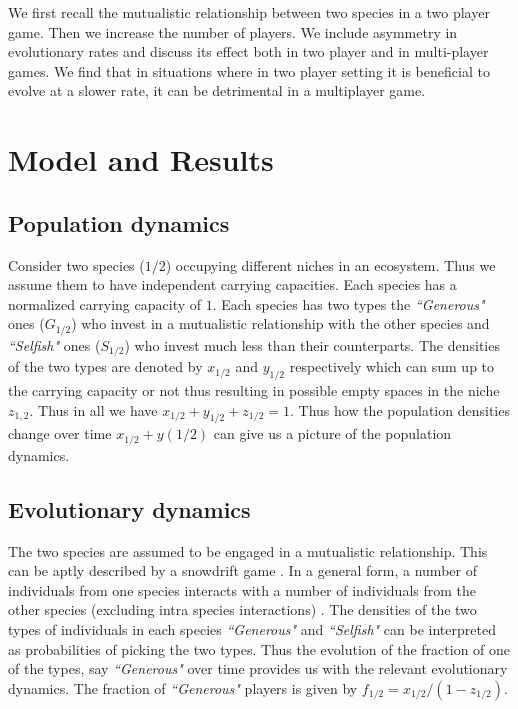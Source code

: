 \documentclass{pnastwo}
\begin{document}
\begin{article}
We first
recall the mutualistic relationship between two species in a two player game.
Then we increase the number of players.
We include asymmetry in evolutionary rates and discuss its effect both in two player and in multi-player games.
We find that in situations where in two player setting it is beneficial to evolve at a slower rate, it can be detrimental in a multiplayer game.


\section{Model and Results}

\subsection{Population dynamics}
Consider two species ($1/2$) occupying different niches in an ecosystem.
Thus we assume them to have independent carrying capacities. Each species has a normalized carrying capacity of $1$. Each species has two types the \textit{``Generous"} ones ($G_{1/2}$) who invest in a mutualistic relationship with the other species and \textit{``Selfish"} ones ($S_{1/2}$) who invest much less than their counterparts. The densities of the two types are denoted by $x_{1/2}$ and $y_{1/2}$ respectively which can sum up to the carrying capacity or not thus resulting in possible empty spaces in the niche $z_{1,2}$. Thus in all we have $x_{1/2} + y_{1/2} + z_{1/2} = 1$.
Thus how the population densities change over time $x_{1/2} + y(1/2)$ can give us a picture of the population dynamics.
\subsection{Evolutionary dynamics}
The two species are assumed to be engaged in a mutualistic relationship. This can be aptly described by a snowdrift game \cite{souza:JTB:2009}. In a general form, a number of individuals from one species interacts with a number of individuals from the other species (excluding intra species interactions) \cite{gokhale:PRSB:2012}. 
The densities of the two types of individuals in each species \textit{``Generous"} and \textit{``Selfish"} can be interpreted as probabilities of picking the two types. Thus the evolution of the fraction of one of the types, say \textit{``Generous"} over time provides us with the relevant evolutionary dynamics. The fraction of \textit{``Generous"} players is given by $f_{1/2} = x_{1/2} / (1- z_{1/2} )$.


\end{article}
\end{document}
